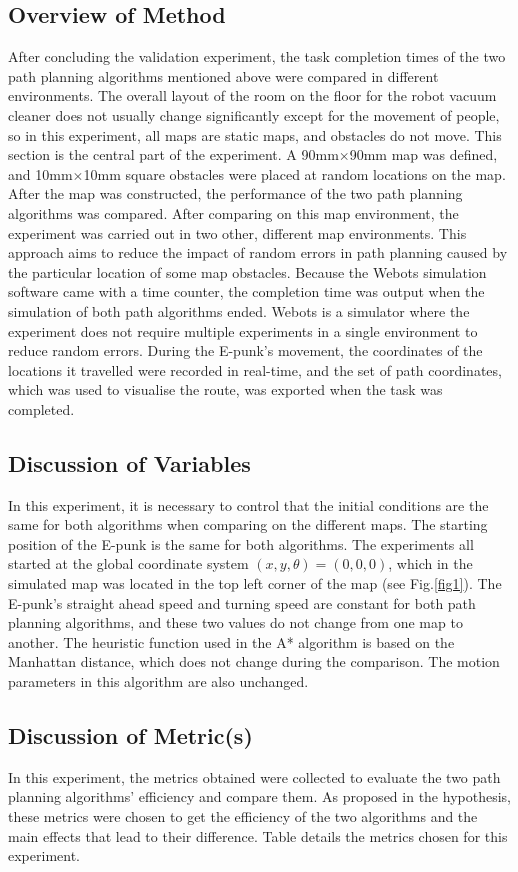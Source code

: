 \documentclass[conference]{IEEEtran}
\begin{document}
\subsection{Overview of Method}
After concluding the validation experiment, the task completion times of the two path planning algorithms mentioned above were compared in different environments. The overall layout of the room on the floor for the robot vacuum cleaner does not usually change significantly except for the movement of people, so in this experiment, all maps are static maps, and obstacles do not move. This section is the central part of the experiment. A 90mm$\times$90mm map was defined, and 10mm$\times$10mm square obstacles were placed at random locations on the map. After the map was constructed, the performance of the two path planning algorithms was compared. After comparing on this map environment, the experiment was carried out in two other, different map environments. This approach aims to reduce the impact of random errors in path planning caused by the particular location of some map obstacles. Because the Webots simulation software came with a time counter, the completion time was output when the simulation of both path algorithms ended. Webots is a simulator where the experiment does not require multiple experiments in a single environment to reduce random errors. During the E-punk's movement, the coordinates of the locations it travelled were recorded in real-time, and the set of path coordinates, which was used to visualise the route, was exported when the task was completed.
\subsection{Discussion of Variables}
In this experiment, it is necessary to control that the initial conditions are the same for both algorithms when comparing on the different maps. The starting position of the E-punk is the same for both algorithms. The experiments all started at the global coordinate system $(x, y, \theta) = (0, 0, 0)$, which in the simulated map was located in the top left corner of the map (see Fig.\ref{fig1}). The E-punk's straight ahead speed and turning speed are constant for both path planning algorithms, and these two values do not change from one map to another. The heuristic function used in the A* algorithm is based on the Manhattan distance, which does not change during the comparison. The motion parameters in this algorithm are also unchanged.

\subsection{Discussion of Metric(s)}
In this experiment, the metrics obtained were collected to evaluate the two path planning algorithms' efficiency and compare them. As proposed in the hypothesis, these metrics were chosen to get the efficiency of the two algorithms and the main effects that lead to their difference. Table \uppercase\expandafter{} details the metrics chosen for this experiment.
\end{document}
